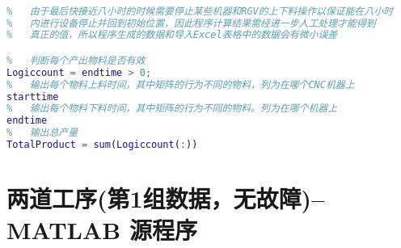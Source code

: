 \documentclass[no-math,withoutpreface,bwprint]{cumcmthesis} %
\numberwithin{equation}{section}
\numberwithin{figure}{section}
\numberwithin{table}{section}
\begin{document}
\begin{lstlisting}[language=matlab]
%   数据输出

%   由于最后快接近八小时的时候需要停止某些机器和RGV的上下料操作以保证能在八小时
%   内进行设备停止并回到初始位置，因此程序计算结果需经进一步人工处理才能得到
%   真正的值，所以程序生成的数据和导入Excel表格中的数据会有微小误差

%   判断每个产出物料是否有效
Logiccount = endtime > 0;
%   输出每个物料上料时间，其中矩阵的行为不同的物料，列为在哪个CNC机器上
starttime
%   输出每个物料下料时间，其中矩阵的行为不同的物料。列为在哪个机器上
endtime
%   输出总产量
TotalProduct = sum(Logiccount(:))
\end{lstlisting}

\section{ 两道工序(第1组数据，无故障)--MATLAB 源程序}
\end{document}
